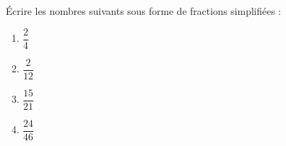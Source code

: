 
\begin{exercice}\label{exosmath-0855}

    Écrire les nombres suivants sous forme de fractions simplifiées :
    \begin{multicols}{4}
        \begin{enumerate}
            \item
                \( \dfrac{ 2 }{ 4 }\)
            \item
                \( \dfrac{ 2 }{ 12 }\)
            \item
                \( \dfrac{ 15 }{ 21 }\)
            \item
                \( \dfrac{ 24 }{ 46 }\)
        \end{enumerate}
    \end{multicols}

\end{exercice}
